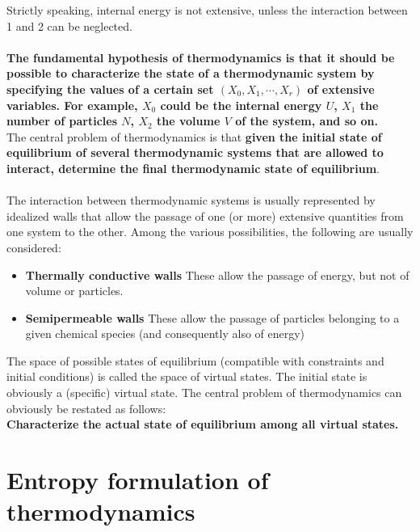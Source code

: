 \documentclass[cyan]{elegantnote}
\begin{document}
Strictly speaking, internal energy is not extensive, unless the interaction between 1 and 2 can be neglected.
\\ \\
\textbf{The fundamental hypothesis of thermodynamics is that it should be possible to characterize the state of a thermodynamic system by specifying the values of a certain set $(X_0, X_1, \cdots, X_r)$ of extensive variables. For example, $X_0$ could be the internal energy $U$, $X_1$ the number of particles $N$, $X_2$ the volume $V$ of the system, and so on.}
\\
The central problem of thermodynamics is that \textbf{given the initial state of equilibrium of several thermodynamic systems that are allowed to interact, determine the final thermodynamic state of equilibrium}.
\\ \\
The interaction between thermodynamic systems is usually represented by idealized walls that allow the passage of one (or more) extensive quantities from one system to the other.
Among the various possibilities, the following are usually considered:
\begin{itemize}
\item \textbf{Thermally conductive walls} These allow the passage of energy, but not of volume or particles. 
\item \textbf{ Semipermeable walls} These allow the passage of particles belonging to a given chemical species (and consequently also of energy)
\end{itemize}
The space of possible states of equilibrium (compatible with constraints and initial conditions) is called the space of virtual states. The initial state is obviously a (specific) virtual state. The central problem of thermodynamics can obviously be restated as follows:
\\
\textbf{Characterize the actual state of equilibrium among all virtual states.}

\section{Entropy formulation of thermodynamics}
\end{document}
